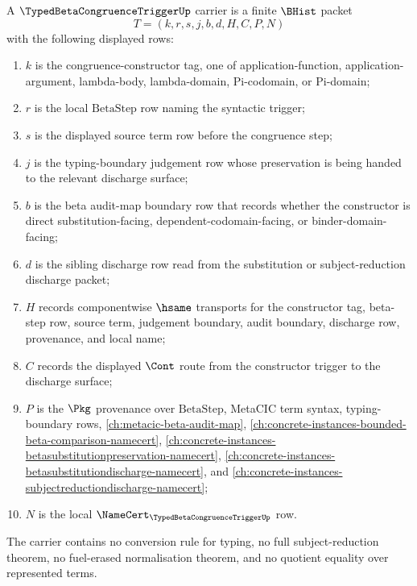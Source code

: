 \begin{definition}
\label{def:typed-beta-congruence-trigger-carrier}
A $\TypedBetaCongruenceTriggerUp$ carrier is a finite $\BHist$ packet
$$
T=(k,r,s,j,b,d,H,C,P,N)
$$
with the following displayed rows:
\begin{enumerate}
\item $k$ is the congruence-constructor tag, one of application-function, application-argument, lambda-body, lambda-domain, Pi-codomain, or Pi-domain;
\item $r$ is the local $\mathrm{BetaStep}$ row naming the syntactic trigger;
\item $s$ is the displayed source term row before the congruence step;
\item $j$ is the typing-boundary judgement row whose preservation is being handed to the relevant discharge surface;
\item $b$ is the beta audit-map boundary row that records whether the constructor is direct substitution-facing, dependent-codomain-facing, or binder-domain-facing;
\item $d$ is the sibling discharge row read from the substitution or subject-reduction discharge packet;
\item $H$ records componentwise $\hsame$ transports for the constructor tag, beta-step row, source term, judgement boundary, audit boundary, discharge row, provenance, and local name;
\item $C$ records the displayed $\Cont$ route from the constructor trigger to the discharge surface;
\item $P$ is the $\Pkg$ provenance over $\mathrm{BetaStep}$, MetaCIC term syntax, typing-boundary rows, \autoref{ch:metacic-beta-audit-map}, \autoref{ch:concrete-instances-bounded-beta-comparison-namecert}, \autoref{ch:concrete-instances-betasubstitutionpreservation-namecert}, \autoref{ch:concrete-instances-betasubstitutiondischarge-namecert}, and \autoref{ch:concrete-instances-subjectreductiondischarge-namecert};
\item $N$ is the local $\NameCert_{\TypedBetaCongruenceTriggerUp}$ row.
\end{enumerate}
The carrier contains no conversion rule for typing, no full subject-reduction theorem, no fuel-erased normalisation theorem, and no quotient equality over represented terms.
\end{definition}

